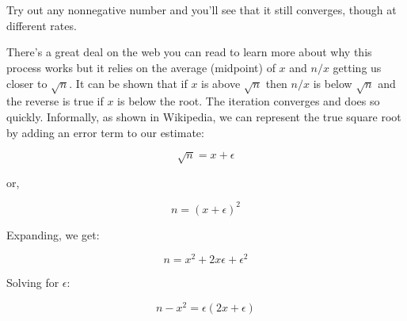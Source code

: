 \begin{fullwidth}
~\\
~\\

Try out any nonnegative number and you'll see that it still converges, though at different rates.

There's a great deal on the web you can read to learn more about why this process works but it relies on the average (midpoint) of $x$ and $n/x$ getting us closer to $\sqrt{n}$.  It can be shown that if $x$ is above $\sqrt{n}$ then $n/x$ is below $\sqrt{n}$ and the reverse is true if $x$ is below the root.  The iteration converges and does so quickly. Informally, as shown in Wikipedia, we can represent the true square root by adding an error term to our estimate:

\[
\sqrt{n} = x + \epsilon
\]

or,

\[
n = (x + \epsilon)^2
\]

Expanding, we get:

\[
n = x^2 + 2x\epsilon + \epsilon^2
\]

Solving for $\epsilon$:

\[
n - x^2 = \epsilon (2x + \epsilon)
\]


\end{fullwidth}
